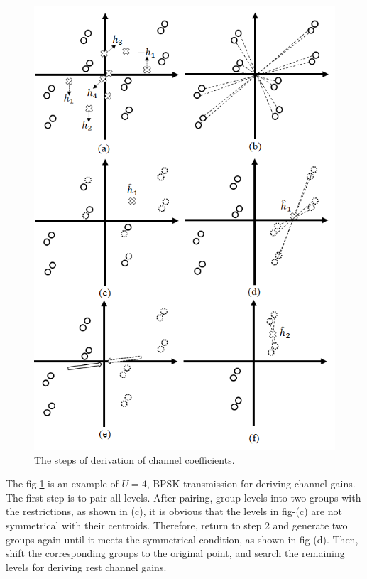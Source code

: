 \begin{figure}[t!]
 \centering
 \includegraphics[width=15cm]{fig/derivation_channel_gain.png}
 \caption{The steps of derivation of channel coefficients.}
 \label{fig:derivation_channel_gain}
\end{figure}

The fig.\ref{fig:derivation_channel_gain} is an example of $U=4$, BPSK transmission for deriving channel gains. The first step is to pair all levels. After pairing, group levels into two groups with the restrictions, as shown in (c), it is obvious that the levels in fig-(c) are not symmetrical with their centroids. Therefore, return to step 2 and generate two groups again until it meets the symmetrical condition, as shown in fig-(d). Then, shift the corresponding groups to the original point, and search the remaining levels for deriving rest channel gains.

